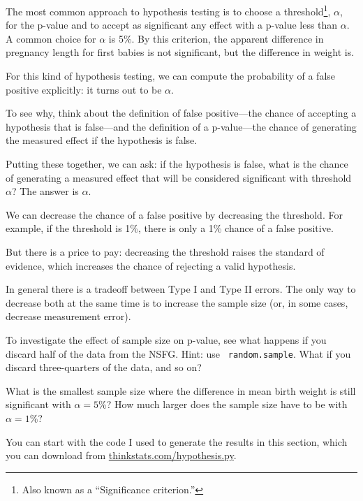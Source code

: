 \documentclass[12pt]{book}
\begin{document}
The most common approach to hypothesis testing is to choose a
threshold\footnote{Also known as a ``Significance criterion.''},
$\alpha$, for the p-value and to accept as significant any effect with
a p-value less than $\alpha$.  A common choice for $\alpha$ is 5\%.
By this criterion, the apparent difference in pregnancy length for
first babies is not significant, but the difference in weight is.



For this kind of hypothesis testing, we can compute the probability of
a false positive explicitly: it turns out to be $\alpha$.

To see why, think about the definition of false positive---the chance
of accepting a hypothesis that is false---and the definition of a
p-value---the chance of generating the measured effect if the
hypothesis is false.

Putting these together, we can ask: if the hypothesis is false,
what is the chance of generating a measured effect that will be
considered significant with threshold $\alpha$?  The answer is
$\alpha$.

We can decrease the chance of a false positive by decreasing the
threshold.  For example, if the threshold is 1\%, there is only a 1\%
chance of a false positive.

But there is a price to pay: decreasing the threshold raises the
standard of evidence, which increases the chance of rejecting
a valid hypothesis.

In general there is a tradeoff between Type I and Type II errors.
The only way to decrease both at the same time is to increase the
sample size (or, in some cases, decrease measurement error).


\begin{ex}

To investigate the effect of sample size on p-value, see what happens
if you discard half of the data from the NSFG.  Hint: use {\tt
  random.sample}.  What if you discard three-quarters of the data, and
so on?


What is the smallest sample size where the difference in mean birth
weight is still significant with $\alpha=5$\%?  How much
larger does the sample size have to be with $\alpha=1$\%?

You can start with the code I used to generate the results in this
section, which you can download from \url{thinkstats.com/hypothesis.py}.


\end{ex}
\end{document}
